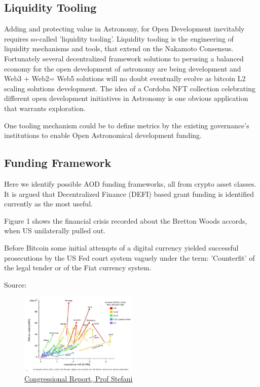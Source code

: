 \documentclass[final,5p,times,twocolumn,authoryear]{elsarticle}
\begin{document}
\subsection{Liquidity Tooling}
\label{btc2:sec:sub:liquidity}
Adding and protecting value in Astronomy, for Open Development inevitably requires so-called 'liquidity tooling'. Liquidity tooling is the engineering of liquidity mechanisms and tools, that extend on the Nakamoto Consensus. Fortunately several decentralized framework solutions to perusing a balanced economy for the open development of astronomy are being development and Web3 + Web2= Web5 solutions will no doubt eventually evolve as bitcoin L2 scaling solutions development. The idea of a Cordoba NFT collection celebrating different open development initiatives in Astronomy is one obvious application that warrants exploration. 

One tooling mechanism could be to define metrics by the existing governance's institutions to enable Open Astronomical development funding.
\subsection{Funding Framework}

Here we identify possible AOD funding frameworks, all from crypto asset classes.  It is argued that Decentralized Finance (DEFI) based grant funding is identified currently as the most useful.

Figure 1 shows the financial crisis recorded about the Bretton Woods accords, when US unilaterally pulled out.

Before Bitcoin some initial attempts of a digital currency yielded successful prosecutions by the US Fed court system vaguely under the term: 'Counterfit' of the legal tender or of the Fiat currency system. 

Source:  
 



\begin{figure}
    \centering
    \includegraphics[width=0.5\textwidth]{figs/Docuemnto_Stefani_2.jpg}
    \caption{\href{https://aargentinapciencias.org/wp-content/uploads/2019/05/Docuemnto_Stefani.pdf}{Congressional Report, Prof Stefani}}
\end{figure}
\end{document}
